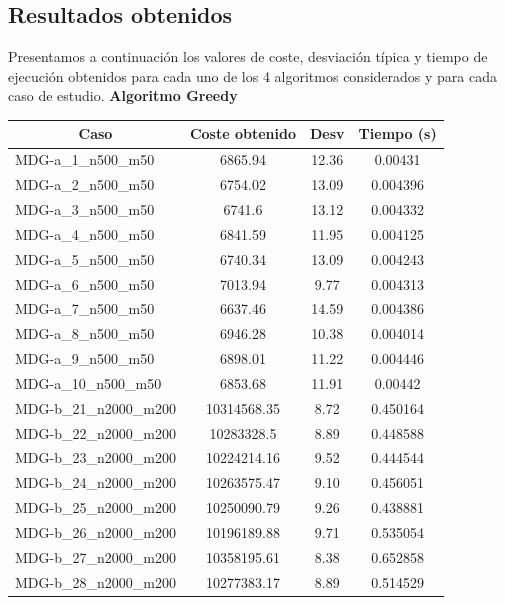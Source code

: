 \documentclass[11pt,a4paper]{article}
\begin{document}
	\subsection{Resultados obtenidos}
	
	Presentamos a continuación los valores de coste, desviación típica y tiempo de ejecución obtenidos para cada uno de los 4 algoritmos considerados y para cada caso de estudio.
	\newpage
	\textbf{Algoritmo Greedy}
\begin{table}[H]
	\begin{center}
		\begin{tabular}{|l|c|c|c|} 
			\hline
			\multicolumn{1}{|c|}{\textbf{Caso}} & \textbf{Coste obtenido} & \textbf{Desv} & \textbf{Tiempo (s)} \\ \hline
			MDG-a\_1\_n500\_m50 & 6865.94 & 12.36 & 0.00431 \\ \hline
			MDG-a\_2\_n500\_m50 & 6754.02 & 13.09 & 0.004396 \\ \hline
			MDG-a\_3\_n500\_m50 & 6741.6 & 13.12 & 0.004332 \\ \hline
			MDG-a\_4\_n500\_m50 & 6841.59 & 11.95 & 0.004125 \\ \hline
			MDG-a\_5\_n500\_m50 & 6740.34 & 13.09 & 0.004243 \\ \hline
			MDG-a\_6\_n500\_m50 & 7013.94 & 9.77 & 0.004313 \\ \hline
			MDG-a\_7\_n500\_m50 & 6637.46 & 14.59 & 0.004386 \\ \hline
			MDG-a\_8\_n500\_m50 & 6946.28 & 10.38 & 0.004014 \\ \hline
			MDG-a\_9\_n500\_m50 & 6898.01 & 11.22 & 0.004446 \\ \hline
			MDG-a\_10\_n500\_m50 & 6853.68 & 11.91 & 0.00442 \\ \hline
			MDG-b\_21\_n2000\_m200 & 10314568.35 & 8.72 & 0.450164 \\ \hline
			MDG-b\_22\_n2000\_m200 & 10283328.5 & 8.89 & 0.448588 \\ \hline
			MDG-b\_23\_n2000\_m200 & 10224214.16 & 9.52 & 0.444544 \\ \hline
			MDG-b\_24\_n2000\_m200 & 10263575.47 & 9.10 & 0.456051 \\ \hline
			MDG-b\_25\_n2000\_m200 & 10250090.79 & 9.26 & 0.438881 \\ \hline
			MDG-b\_26\_n2000\_m200 & 10196189.88 & 9.71 & 0.535054 \\ \hline
			MDG-b\_27\_n2000\_m200 & 10358195.61 & 8.38 & 0.652858 \\ \hline
			MDG-b\_28\_n2000\_m200 & 10277383.17 & 8.89 & 0.514529 \\ \hline

\end{tabular}
\end{center}
\end{table}
\end{document}
